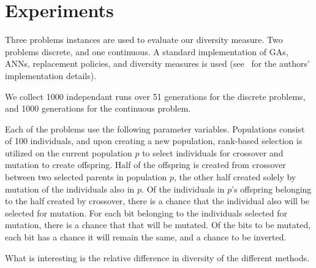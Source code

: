 \section{Experiments}
Three problems instances are used to evaluate our diversity measure. Two problems discrete, and one continuous. A standard implementation of GAs, ANNs, replacement policies, and diversity measures is used (see~\cite{mbm:kmc:ekoGA} for the authors' implementation details). 

We collect \num{1000} independant runs over \num{51} generations for the discrete problems, and \num{1000} generations for the continuous problem.

Each of the problems use the following parameter variables. Populations consist of \num{100} individuals, and upon creating a new population, rank-based selection is utilized on the current population $p$ to select individuals for crossover and mutation to create offspring. Half of the offspring is created from crossover between two selected parents in population $p$, the other half created solely by mutation of the individuals also in $p$. Of the individuals in $p$'s offspring belonging to the half created by crossover, there is a  chance that the individual also will be selected for mutation. For each bit belonging to the individuals selected for mutation, there is a  chance that that will be mutated. Of the bits to be mutated, each bit has a  chance it will remain the same, and a  chance to be inverted.

What is interesting is the relative difference in diversity of the different methods.




